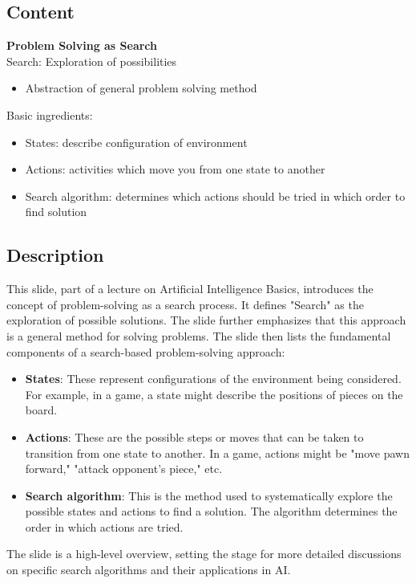 \documentclass{article}%
\begin{document}
\subsection{Content}%

\textbf{Problem Solving as Search} \\
Search: Exploration of possibilities \\
\begin{itemize}
    \item Abstraction of general problem solving method
\end{itemize}
Basic ingredients: \\
\begin{itemize}
    \item States: describe configuration of environment \\
    \item Actions: activities which move you from one state to another \\
    \item Search algorithm: determines which actions should be tried in which order to find solution
\end{itemize}
%
\subsection{Description}%
This slide, part of a lecture on Artificial Intelligence Basics, introduces the concept of problem-solving as a search process.  It defines "Search" as the exploration of possible solutions.  The slide further emphasizes that this approach is a general method for solving problems.  The slide then lists the fundamental components of a search-based problem-solving approach:  
\begin{itemize}
    \item \textbf{States}:  These represent configurations of the environment being considered.  For example, in a game, a state might describe the positions of pieces on the board.
    \item \textbf{Actions}: These are the possible steps or moves that can be taken to transition from one state to another.  In a game, actions might be "move pawn forward," "attack opponent's piece," etc.
    \item \textbf{Search algorithm}: This is the method used to systematically explore the possible states and actions to find a solution.  The algorithm determines the order in which actions are tried.
\end{itemize}
The slide is a high-level overview, setting the stage for more detailed discussions on specific search algorithms and their applications in AI.%
\end{document}
